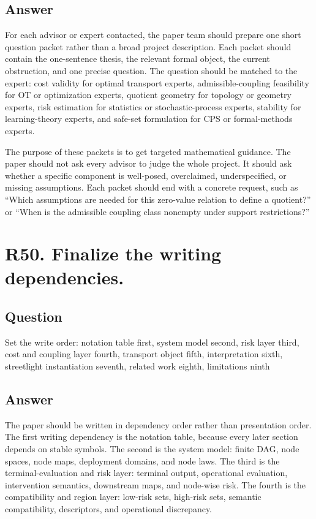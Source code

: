 \documentclass[11pt,a4paper]{article}
\begin{document}
\subsection*{Answer}

For each advisor or expert contacted, the paper team should prepare one short question packet rather than a broad project description. Each packet should contain the one-sentence thesis, the relevant formal object, the current obstruction, and one precise question. The question should be matched to the expert: cost validity for optimal transport experts, admissible-coupling feasibility for OT or optimization experts, quotient geometry for topology or geometry experts, risk estimation for statistics or stochastic-process experts, stability for learning-theory experts, and safe-set formulation for CPS or formal-methods experts.

The purpose of these packets is to get targeted mathematical guidance. The paper should not ask every advisor to judge the whole project. It should ask whether a specific component is well-posed, overclaimed, underspecified, or missing assumptions. Each packet should end with a concrete request, such as ``Which assumptions are needed for this zero-value relation to define a quotient?'' or ``When is the admissible coupling class nonempty under support restrictions?''

\section*{R50. Finalize the writing dependencies.}

\subsection*{Question}

Set the write order: notation table first, system model second, risk layer third, cost and coupling layer fourth, transport object fifth, interpretation sixth, streetlight instantiation seventh, related work eighth, limitations ninth

\subsection*{Answer}

The paper should be written in dependency order rather than presentation order. The first writing dependency is the notation table, because every later section depends on stable symbols. The second is the system model: finite DAG, node spaces, node maps, deployment domains, and node laws. The third is the terminal-evaluation and risk layer: terminal output, operational evaluation, intervention semantics, downstream maps, and node-wise risk. The fourth is the compatibility and region layer: low-risk sets, high-risk sets, semantic compatibility, descriptors, and operational discrepancy.
\end{document}
